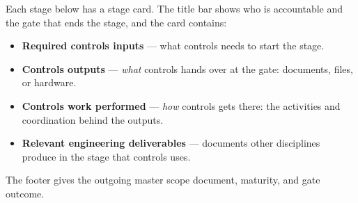 Each stage below has a stage card. The title bar shows who is accountable and the gate that ends the stage, and the card contains:
\begin{itemize}[itemsep=0pt,topsep=2pt]
  \item \textbf{Required controls inputs} --- what controls needs to start the stage.
  \item \textbf{Controls outputs} --- \textit{what} controls hands over at the gate: documents, files, or hardware.
  \item \textbf{Controls work performed} --- \textit{how} controls gets there: the activities and coordination behind the outputs.
  \item \textbf{Relevant engineering deliverables} --- documents other disciplines produce in the stage that controls uses.
\end{itemize}
The footer gives the outgoing master scope document, maturity, and gate outcome.

\newenvironment{stagecard}[2]{%
  \begin{tcolorbox}[enhanced,breakable,colback=white,colframe=headblue,boxrule=0.6pt,arc=2pt,
    title={#1\hfill #2},fonttitle=\small\bfseries,left=6pt,right=6pt,top=4pt,bottom=4pt,
    before skip=4pt,after skip=10pt]\small}%
  {\end{tcolorbox}}
\newcommand{\stagesummary}[1]{\textit{#1}\par}
\newcommand{\stagehead}[1]{\textbf{\color{headblue}#1}}
\newcommand{\stagefoot}[4]{\footnotesize\textbf{Outgoing master scope document:} #1\par
  \textbf{Project maturity:} #2\qquad \textbf{Engineering maturity:} #3\par
  \textbf{Gate outcome:} #4\par}

